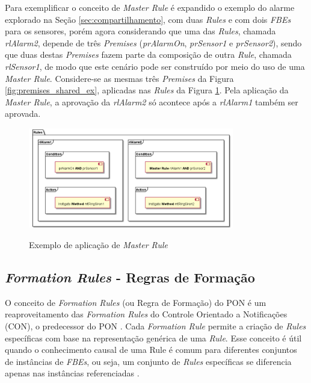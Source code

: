 Para exemplificar o conceito de \textit{Master Rule} é expandido o exemplo do
alarme explorado na Seção \ref{sec:compartilhamento}, com duas \textit{Rules} e
com dois \textit{FBEs} para os sensores, porém agora considerando que uma das
\textit{Rules}, chamada \textit{rlAlarm2}, depende de três \textit{Premises}
(\textit{prAlarmOn}, \textit{prSensor1} e \textit{prSensor2}), sendo que duas
destas \textit{Premises} fazem parte da composição de outra \textit{Rule},
chamada \textit{rlSensor1}, de modo que este cenário pode ser construído por
meio do uso de uma \textit{Master Rule}. Considere-se as mesmas três
\textit{Premises} da Figura \ref{fig:premises_shared_ex}, aplicadas nas
\textit{Rules} da Figura \ref{fig:master_rule}. Pela aplicação da \textit{Master
Rule}, a aprovação da \textit{rlAlarm2} só acontece após a \textit{rlAlarm1}
também ser aprovada.

\begin{figure}[!htb]
  \centering
  \caption{Exemplo de aplicação de \textit{Master Rule}}
  \includegraphics[width=0.8\textwidth]{../out/diagrams/master_rule/rules.png}
  \smallskip
  \label{fig:master_rule}
\end{figure}

\subsection{\textit{Formation Rules} - Regras de Formação}

O conceito de \textit{Formation Rules} (ou Regra de Formação) do PON é um
reaproveitamento das \textit{Formation Rules} do Controle Orientado a
Notificações (CON), o predecessor do PON \cite{msc_simao_2001}. Cada
\textit{Formation Rule} permite a criação de \textit{Rules} específicas com base
na representação genérica de uma \textit{Rule}. Esse conceito é útil quando o
conhecimento causal de uma Rule é comum para diferentes conjuntos de instâncias
de \textit{FBEs}, ou seja, um conjunto de \textit{Rules} específicas se
diferencia apenas nas instâncias referenciadas \cite{doc_ronszcka_2019}.

